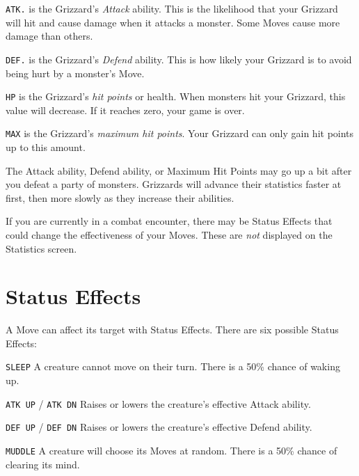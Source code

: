 \documentclass[10pt,twocolumn,openany,article]{memoir}
\newenvironment{rdescribe}{\begin{description}\raggedright}{\end{description}}
\begin{document}
\begin{rdescribe}
  
\item[\texttt{ATK.}] is  the Grizzard's  \emph{Attack} ability.  This is
  the likelihood  that your Grizzard will  hit and cause damage  when it
  attacks a monster. Some Moves cause more damage than others.
  
\item[\texttt{DEF.}] is  the Grizzard's  \emph{Defend} ability.  This is
  how likely your Grizzard is to avoid being hurt by a monster's Move.

\item[\texttt{HP}]  is  the  Grizzard's  \emph{hit  points}  or  health.
  When  monsters hit  your Grizzard,  this  value will  decrease. If  it
  reaches zero, your game is over.

\item[\texttt{MAX}]  is   the  Grizzard's  \emph{maximum   hit  points}.
  Your Grizzard can only gain hit points up to this amount.
  
\end{rdescribe}

The Attack  ability, Defend  ability, or  Maximum Hit  Points may  go up
a bit after you defeat a party of monsters. Grizzards will advance their
statistics  faster  at   first,  then  more  slowly   as  they  increase
their abilities.

If you are currently in a  combat encounter, there may be Status Effects
that could change the effectiveness  of your Moves. These are \emph{not}
displayed on the Statistics screen.

\section{Status Effects}\label{sec:StatusEffects}

A Move can affect its target with Status Effects. There are six possible
Status Effects:

\begin{rdescribe}
\item[\texttt{SLEEP}] A  creature cannot  move on their turn.  There is
  a 50\% chance of waking up.
\item[\texttt{ATK UP} / \texttt{ATK DN}] Raises or lowers the creature's
  effective Attack ability.
\item[\texttt{DEF UP} / \texttt{DEF DN}] Raises or lowers the creature's
  effective Defend ability.
\item[\texttt{MUDDLE}]  A  creature will  choose  its  Moves at  random.
  There is a 50\% chance of clearing its mind.
\end{rdescribe}
\end{document}
